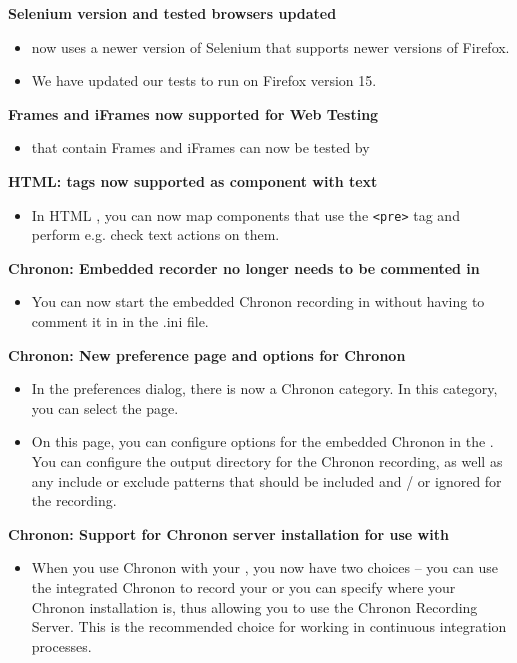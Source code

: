 \textbf{Selenium version and tested browsers updated}
\begin{itemize}
\item \app{} now uses a newer version of Selenium that supports newer versions of Firefox.
\item We have updated our tests to run on Firefox version 15.
\end{itemize}

\textbf{Frames and iFrames now supported for Web Testing}
\begin{itemize}
\item \gdauts{} that contain Frames and iFrames can now be tested by \app{}
\end{itemize}

\textbf{HTML: tags now supported as component with text}
\begin{itemize}
\item In HTML \gdauts{}, you can now map components that use the \verb+<pre>+ tag and perform e.g. check text actions on them.
\end{itemize}

\textbf{Chronon: Embedded recorder no longer needs to be commented in}
\begin{itemize}
\item You can now start the embedded Chronon recording in \app{} without having to comment it in in the .ini file. 
\end{itemize}

\textbf{Chronon: New preference page and options for \ite{} Chronon}
\begin{itemize}
\item In the preferences dialog, there is now a Chronon category. In this category, you can select the  page. 
\item On this page, you can configure options for the embedded Chronon in the \ite{}. You can configure the output directory for the Chronon recording, as well as any include or exclude patterns that should be included and / or ignored for the recording.  
\end{itemize}

\textbf{Chronon: Support for Chronon server installation for use with \gdauts{}}
\begin{itemize}
\item When you use Chronon with your \gdaut{}, you now have two choices -- you can use the integrated Chronon to record your \gdaut{} or you can specify where your Chronon installation is, thus allowing you to use the Chronon Recording Server. This is the recommended choice for working in continuous integration processes.   
\end{itemize}

